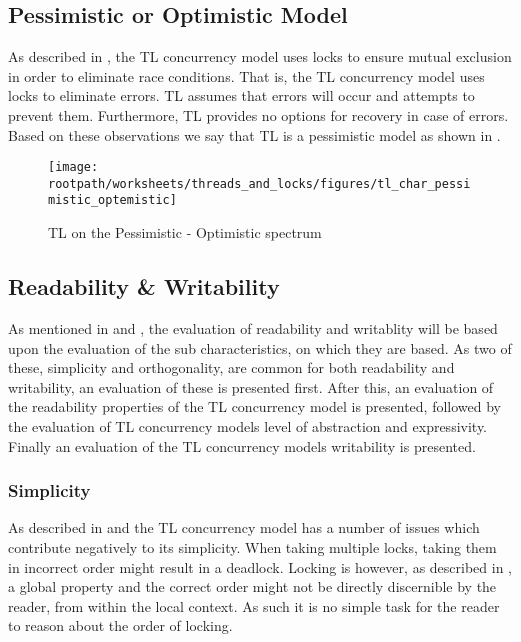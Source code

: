 \subsection{Pessimistic or Optimistic Model}
As described in , the \ac{TL} concurrency model uses locks to ensure mutual exclusion in order to eliminate race conditions. That is, the \ac{TL} concurrency model uses locks to eliminate errors. \ac{TL} assumes that errors will occur and attempts to prevent them. Furthermore, \ac{TL} provides no options for recovery in case of errors. Based on these observations we say that \ac{TL} is a pessimistic model as shown in .

\begin{figure}[htbp]
\centering
 \texttt{[image: \\rootpath/worksheets/threads\_and\_locks/figures/tl\_char\_pessimistic\_optemistic]} 
 \caption{\ac{TL} on the Pessimistic - Optimistic spectrum}
\label{fig:char_pes_opti}
\end{figure}

\subsection{Readability \& Writability}
As mentioned in  and , the evaluation of readability and writablity will be based upon the evaluation of the sub characteristics, on which they are based. As two of these, simplicity and orthogonality, are common for both readability and writability, an evaluation of these is presented first. After this, an evaluation of the readability properties of the \ac{TL} concurrency model is presented, followed by the evaluation of \ac{TL} concurrency models level of abstraction and expressivity. Finally an evaluation of the \ac{TL} concurrency models writability is presented.

\subsubsection{Simplicity}\label{subsec:tl_simplicity_read}
As described in  and  the \ac{TL} concurrency model has a number of issues which contribute negatively to its simplicity. When taking multiple locks, taking them in incorrect order might result in a deadlock. Locking is however, as described in , a global property and the correct order might not be directly discernible by the reader, from within the local context. As such it is no simple task for the reader to reason about the order of locking.

